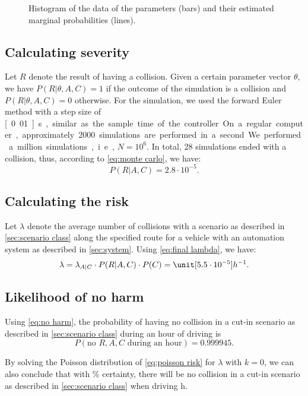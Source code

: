 \setlength{}
\setlength{}
\begin{figure}
	\centering
	
	\caption{Histogram of the data of the parameters (bars) and their estimated marginal probabilities (lines).}
	\label{fig:histogram}
\end{figure}



\subsection{Calculating severity}
\label{sec:example simulations}

Let $R$ denote the result of having a collision. Given a certain parameter vector $\theta$, we have $P(R|\theta,A,C)=1$ if the outcome of the simulation is a collision and $P(R|\theta,A,C)=0$ otherwise. For the simulation, we used the forward Euler method with a step size of \unit[0.01]{s}, similar as the sample time of the controller. On a regular computer, approximately 2000 simulations are performed in a second. We performed a million simulations, i.e., $N=10^6$. In total, 28 simulations ended with a collision, thus, according to \cref{eq:monte carlo}, we have:
\begin{equation}
	P(R|A,C) = 2.8 \cdot 10^{-5}.
\end{equation}



\subsection{Calculating the risk}
\label{sec:example risk}

Let $\lambda$ denote the average number of collisions with a scenario as described in \cref{sec:scenario class} along the specified route for a vehicle with an automation system as described in \cref{sec:system}. Using \cref{eq:final lambda}, we have:
\begin{equation}
	\lambda = \lambda_{A|C} \cdot P(R|A,C) \cdot P(C) = \unit[5.5 \cdot 10^{-5}]{h^{-1}}.
\end{equation}



\subsection{Likelihood of no harm}
\label{sec:example no harm}

Using \cref{eq:no harm}, the probability of having no collision in a cut-in scenario as described in \cref{sec:scenario class} during an hour of driving is
\begin{equation}
	P(\text{no }R,A,C\text{ during an hour}) = 0.999945.
\end{equation}

By solving the Poisson distribution of \cref{eq:poisson risk} for $\lambda$ with $k=0$, we can also conclude that with \unit[95]{\%} certainty, there will be no collision in a cut-in scenario as described in \cref{sec:scenario class} when driving \unit[925]{h}.
